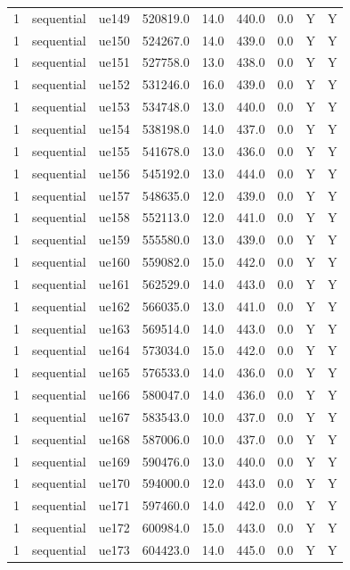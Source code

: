 \begin{table}[ht]
\begin{tabular}{|c|c|c|c|c|c|c|c|c|}
1 & sequential & ue149 & 520819.0 & 14.0 & 440.0 & 0.0 & Y & Y \\
1 & sequential & ue150 & 524267.0 & 14.0 & 439.0 & 0.0 & Y & Y \\
1 & sequential & ue151 & 527758.0 & 13.0 & 438.0 & 0.0 & Y & Y \\
1 & sequential & ue152 & 531246.0 & 16.0 & 439.0 & 0.0 & Y & Y \\
1 & sequential & ue153 & 534748.0 & 13.0 & 440.0 & 0.0 & Y & Y \\
1 & sequential & ue154 & 538198.0 & 14.0 & 437.0 & 0.0 & Y & Y \\
1 & sequential & ue155 & 541678.0 & 13.0 & 436.0 & 0.0 & Y & Y \\
1 & sequential & ue156 & 545192.0 & 13.0 & 444.0 & 0.0 & Y & Y \\
1 & sequential & ue157 & 548635.0 & 12.0 & 439.0 & 0.0 & Y & Y \\
1 & sequential & ue158 & 552113.0 & 12.0 & 441.0 & 0.0 & Y & Y \\
1 & sequential & ue159 & 555580.0 & 13.0 & 439.0 & 0.0 & Y & Y \\
1 & sequential & ue160 & 559082.0 & 15.0 & 442.0 & 0.0 & Y & Y \\
1 & sequential & ue161 & 562529.0 & 14.0 & 443.0 & 0.0 & Y & Y \\
1 & sequential & ue162 & 566035.0 & 13.0 & 441.0 & 0.0 & Y & Y \\
1 & sequential & ue163 & 569514.0 & 14.0 & 443.0 & 0.0 & Y & Y \\
1 & sequential & ue164 & 573034.0 & 15.0 & 442.0 & 0.0 & Y & Y \\
1 & sequential & ue165 & 576533.0 & 14.0 & 436.0 & 0.0 & Y & Y \\
1 & sequential & ue166 & 580047.0 & 14.0 & 436.0 & 0.0 & Y & Y \\
1 & sequential & ue167 & 583543.0 & 10.0 & 437.0 & 0.0 & Y & Y \\
1 & sequential & ue168 & 587006.0 & 10.0 & 437.0 & 0.0 & Y & Y \\
1 & sequential & ue169 & 590476.0 & 13.0 & 440.0 & 0.0 & Y & Y \\
1 & sequential & ue170 & 594000.0 & 12.0 & 443.0 & 0.0 & Y & Y \\
1 & sequential & ue171 & 597460.0 & 14.0 & 442.0 & 0.0 & Y & Y \\
1 & sequential & ue172 & 600984.0 & 15.0 & 443.0 & 0.0 & Y & Y \\
1 & sequential & ue173 & 604423.0 & 14.0 & 445.0 & 0.0 & Y & Y \\

\end{tabular}
\end{table}
